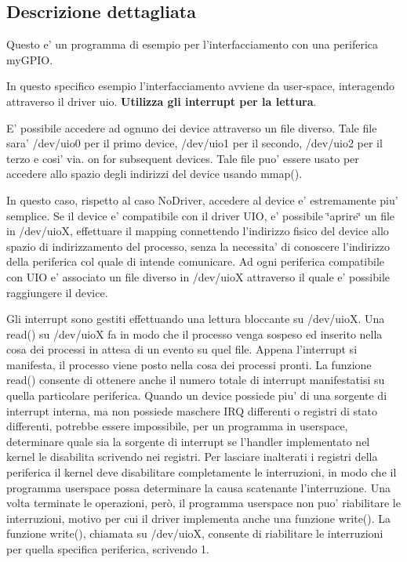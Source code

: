 \subsection{Descrizione dettagliata}
Questo e' un programma di esempio per l'interfacciamento con una periferica my\+G\+P\+I\+O. 

In questo specifico esempio l'interfacciamento avviene da user-\/space, interagendo attraverso il driver uio. {\bfseries Utilizza gli interrupt per la lettura}.

E' possibile accedere ad ognuno dei device attraverso un file diverso. Tale file sara' /dev/uio0 per il primo device, /dev/uio1 per il secondo, /dev/uio2 per il terzo e cosi' via. on for subsequent devices. Tale file puo' essere usato per accedere allo spazio degli indirizzi del device usando mmap().

In questo caso, rispetto al caso No\+Driver, accedere al device e' estremamente piu' semplice. Se il device e' compatibile con il driver U\+I\+O, e' possibile \char`\"{}aprire\char`\"{} un file in /dev/uio\+X, effettuare il mapping connettendo l'indirizzo fisico del device allo spazio di indirizzamento del processo, senza la necessita' di conoscere l'indirizzo della periferica col quale di intende comunicare. Ad ogni periferica compatibile con U\+I\+O e' associato un file diverso in /dev/uio\+X attraverso il quale e' possibile raggiungere il device.

Gli interrupt sono gestiti effettuando una lettura bloccante su /dev/uio\+X. Una read() su /dev/uio\+X fa in modo che il processo venga sospeso ed inserito nella cosa dei processi in attesa di un evento su quel file. Appena l'interrupt si manifesta, il processo viene posto nella cosa dei processi pronti. La funzione read() consente di ottenere anche il numero totale di interrupt manifestatisi su quella particolare periferica. Quando un device possiede piu' di una sorgente di interrupt interna, ma non possiede maschere I\+R\+Q differenti o registri di stato differenti, potrebbe essere impossibile, per un programma in userspace, determinare quale sia la sorgente di interrupt se l'handler implementato nel kernel le disabilita scrivendo nei registri. Per lasciare inalterati i registri della periferica il kernel deve disabilitare completamente le interruzioni, in modo che il programma userspace possa determinare la causa scatenante l'interruzione. Una volta terminate le operazioni, però, il programma userspace non puo' riabilitare le interruzioni, motivo per cui il driver implementa anche una funzione write(). La funzione write(), chiamata su /dev/uio\+X, consente di riabilitare le interruzioni per quella specifica periferica, scrivendo 1. 

